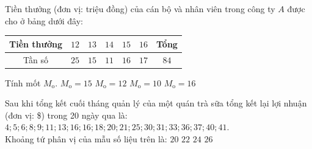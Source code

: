 \begin{ex}%
	Tiền thưởng (đơn vị: triệu đồng) của cán bộ và nhân viên trong công ty $A$ được cho ở bảng dưới đây:
	\begin{center}
		\begin{tabular}{|c|c|c|c|c|c|c|}
		\hline
		Tiền thưởng & $12$ & $13$ & $14$ & $15$ & $16$ & Tổng \\ \hline
		Tần số      & $25$ & $15$ & $11$ & $16$ & $17$ & $84$ \\ \hline
	\end{tabular}
	\end{center}
	Tính mốt $M_\text{o}$.
	\choice
	{$M_\text{o}=15$}
	{\True $M_\text{o}=12$}
	{$M_\text{o}=10$}
	{$M_\text{o}=16$}
\end{ex}

\begin{ex}%
	Sau khi tổng kết cuối tháng quản lý của một quán trà sữa tổng kết lại lợi nhuận (đơn vị: \$) trong 20 ngày qua là:\\
	$4;5;6;8;9;11;13;16;16;18;20;21;25;30;31;33;36;37;40;41$.\\
	Khoảng tứ phân vị của mẫu số liệu trên là:
	\choice
	{$20$}
	{\True $22$}
	{$24$}
	{$26$}
\end{ex}

